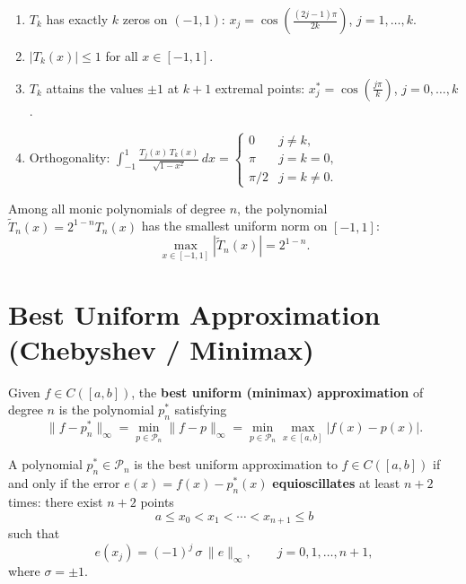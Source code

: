 \begin{theorem}
\label{thm:chebyshev-properties}
\begin{enumerate}
    \item $T_k$ has exactly $k$ zeros on $(-1,1)$: $x_j = \cos\!\left(\frac{(2j-1)\pi}{2k}\right)$, $j=1,\ldots,k$.
    \item $|T_k(x)| \leq 1$ for all $x \in [-1,1]$.
    \item $T_k$ attains the values $\pm 1$ at $k+1$ extremal points:
    $x_j^* = \cos\!\left(\frac{j\pi}{k}\right)$, $j = 0, \ldots, k$.
    \item Orthogonality: $\displaystyle\int_{-1}^{1} \frac{T_j(x)\,T_k(x)}{\sqrt{1-x^2}}\,dx = \begin{cases} 0 & j \neq k, \\ \pi & j = k = 0, \\ \pi/2 & j = k \neq 0. \end{cases}$
\end{enumerate}
\end{theorem}

\begin{theorem}
\label{thm:chebyshev-minimax}
Among all monic polynomials of degree $n$, the polynomial $\widetilde{T}_n(x) = 2^{1-n} T_n(x)$ has the smallest uniform norm on $[-1,1]$:
\[
    \max_{x \in [-1,1]} |\widetilde{T}_n(x)| = 2^{1-n}.
\]
\end{theorem}

\section{Best Uniform Approximation (Chebyshev / Minimax)}

\begin{definition}
\label{def:best-uniform}
Given $f \in C([a,b])$, the \textbf{best uniform (minimax) approximation} of degree $n$ is the polynomial $p_n^*$ satisfying
\[
    \|f - p_n^*\|_\infty = \min_{p \in \mathcal{P}_n} \|f - p\|_\infty = \min_{p \in \mathcal{P}_n} \max_{x \in [a,b]} |f(x) - p(x)|.
\]
\end{definition}

\begin{theorem}
\label{thm:equioscillation}
A polynomial $p_n^* \in \mathcal{P}_n$ is the best uniform approximation to $f \in C([a,b])$ if and only if the error $e(x) = f(x) - p_n^*(x)$ \textbf{equioscillates} at least $n+2$ times: there exist $n+2$ points
\[
    a \leq x_0 < x_1 < \cdots < x_{n+1} \leq b
\]
such that
\[
    e(x_j) = (-1)^j \, \sigma \, \|e\|_\infty, \qquad j = 0, 1, \ldots, n+1,
\]
where $\sigma = \pm 1$.
\end{theorem}

